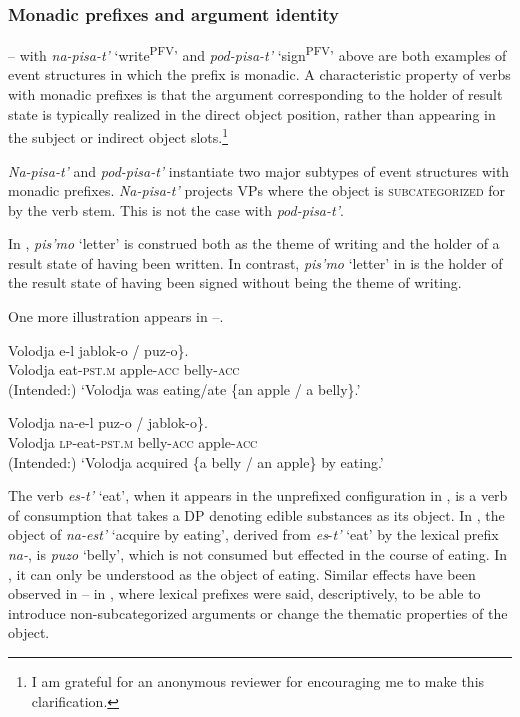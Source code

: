 \documentclass[output=paper,colorlinks,citecolor=brown]{langscibook}
\begin{document}
\subsubsection{Monadic prefixes and argument identity}\label{sec:3.3.1}
\hypertarget{RefHeadingToc164647628}{}
-- with \textit{na-pisa-t’} ‘write\textsuperscript{PFV}’ and \textit{pod-pisa-t’} ‘sign\textsuperscript{PFV}’ above are both examples of event structures in which the prefix is monadic. A characteristic property of verbs with monadic prefixes is that the argument corresponding to the holder of result state is typically realized in the direct object position, rather than appearing in the subject or indirect object slots.\footnote{I am grateful for an anonymous reviewer for encouraging me to make this clarification.}

\textit{Na-pisa-t’} and \textit{pod-pisa-t’} instantiate two major subtypes of event structures with monadic prefixes. \textit{Na-pisa-t’} projects VPs where the object is \textsc{subcategorized} for by the verb stem. This is not the case with \textit{pod-pisa-t’}. 

In , \textit{pis’mo} ‘letter’ is construed  both as the theme of writing and the holder of a result state of having been written. In contrast, \textit{pis’mo} ‘letter’ in  is the holder of the result state of having been signed without being the theme of writing.

One more illustration appears in --.

\ea\label{ex:tatevosov:75}
\gll Volodja  e-l  \minsp{\{} jablok-o  /  \minsp{\#} puz-o\}.\\
  Volodja     eat-\textsc{pst.m}    {} apple-\textsc{acc} {} {} belly-\textsc{acc}\\
\glt   (Intended:) ‘Volodja was eating/ate \{an apple / a belly\}.’
\z

\ea\label{ex:tatevosov:76}
 \gll Volodja na-e-l  \minsp{\{} puz-o  /    \minsp{*} jablok-o\}.\\
  Volodja \textsc{lp}-eat-\textsc{pst.m} {} belly-\textsc{acc} {} {} apple-\textsc{acc}          \\
\glt  (Intended:) ‘Volodja acquired \{a belly / an apple\} by eating.’
\z

\noindent The verb \textit{es-t’} ‘eat’, when it appears in the unprefixed configuration in , is a verb of consumption that takes a DP denoting edible substances as its object. In , the object of \textit{na-est’} ‘acquire by eating’, derived from \textit{es}-\textit{t’} ‘eat’ by the lexical prefix \textit{na-}, is \textit{puzo} ‘belly’, which is not consumed but effected in the course of eating. In , it can only be understood as the object of eating. Similar effects have been observed in -- in , where lexical prefixes were said, descriptively, to be able to introduce non-subcategorized arguments or change the thematic properties of the object.
\end{document}
